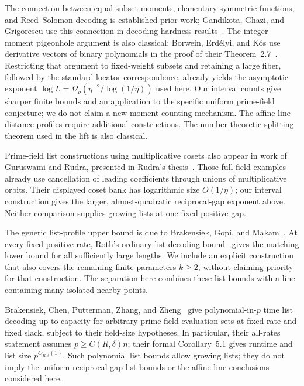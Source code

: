 \documentclass[11pt,letterpaper]{article}
\theoremstyle{definition}
\theoremstyle{remark}
\begin{document}
The connection between equal subset moments, elementary symmetric
functions, and Reed--Solomon decoding is established prior work;
Gandikota, Ghazi, and Grigorescu use this connection in decoding
hardness results~\cite{ggg}. The integer moment pigeonhole argument is
also classical: Borwein, Erd\'elyi, and K\'os use derivative vectors of
binary polynomials in the proof of their Theorem~2.7~\cite{bek}.
Restricting that argument to fixed-weight subsets and retaining a large
fiber, followed by the standard locator correspondence, already yields
the asymptotic exponent
$\log L=\Omega_\rho(\eta^{-2}/\log(1/\eta))$ used here.
Our interval counts give sharper finite bounds and an application to the
specific uniform prime-field conjecture; we do not claim a new moment
counting mechanism. The affine-line distance profiles require additional
constructions. The number-theoretic splitting theorem used in the lift is
also classical.

Prime-field list constructions using multiplicative cosets also appear
in work of Guruswami and Rudra, presented in
Rudra's thesis~\cite[Section~6.4.3]{rudra-thesis}. Those full-field
examples already use cancellation of leading coefficients through
unions of multiplicative orbits. Their displayed coset bank has
logarithmic size $O(1/\eta)$; our interval construction gives the
larger, almost-quadratic reciprocal-gap exponent above. Neither
comparison supplies growing lists at one fixed positive gap.

The generic list-profile upper bound is due to Brakensiek, Gopi, and
Makam~\cite{bgm}. At every fixed positive rate, Roth's ordinary
list-decoding bound~\cite{roth} gives the matching lower bound for all
sufficiently large lengths. We include an explicit construction that
also covers the remaining finite parameters $k\ge2$, without claiming
priority for that construction. The separation here combines these
list bounds with a line containing many isolated nearby points.

Brakensiek, Chen, Putterman, Zhang, and Zheng~\cite{bcpzz-capacity}
give polynomial-in-$p$ time list decoding up to capacity for arbitrary
prime-field evaluation sets at fixed rate and fixed slack, subject to
their field-size hypotheses. In particular, their all-rates statement
assumes $p\ge C(R,\delta)n$; their formal Corollary~5.1 gives runtime
and list size $p^{O_{R,\delta}(1)}$. Such polynomial list bounds allow growing lists;
they do not imply the uniform reciprocal-gap list bounds or the
affine-line conclusions considered here.
\end{document}
